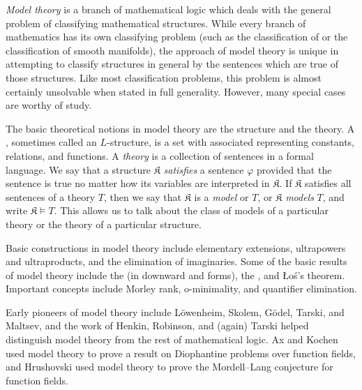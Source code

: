 \documentclass[12pt]{article}
\begin{document}

\emph{Model theory} is a branch of mathematical logic which deals with the general problem of classifying mathematical structures.  While every branch of mathematics has its own classifying problem (such as the classification of  or the classification of smooth manifolds), the approach of model theory is unique in attempting to classify structures in general by the sentences which are true of those structures.  Like most classification problems, this problem is almost certainly unsolvable when stated in full generality.  However, many special cases are worthy of study.

The basic theoretical notions in model theory are the structure and the theory.  A \emph{}, sometimes called an $L$-structure, is a set with associated  representing constants, relations, and functions.  A \emph{theory} is a collection of sentences in a formal language.  We say that a structure $\mathfrak{K}$ \emph{satisfies} a sentence $\varphi$ provided that the sentence is true no matter how its variables are interpreted in $\mathfrak{K}$.  If $\mathfrak{K}$ satisfies all sentences of a theory $T$, then we say that $\mathfrak{K}$ is a \emph{model} or $T$, or $\mathfrak{K}$ \emph{models} $T$, and write $\mathfrak{K}\models T$.  This allows us to talk about the class of models of a particular theory or the theory of a particular structure.

Basic constructions in model theory include elementary extensions, ultrapowers and ultraproducts, and the elimination of imaginaries.  Some of the basic results of model theory include the  (in downward and  forms), the , and \L o\'s's theorem.  Important concepts include Morley rank, o-minimality, and quantifier elimination.

Early pioneers of model theory include L\"owenheim, Skolem, G\"odel, Tarski, and Maltsev, and the work of Henkin, Robinson, and (again) Tarski helped distinguish model theory from the rest of mathematical logic.  Ax and Kochen used model theory to prove a result on Diophantine problems over function fields, and Hrushovski used model theory to prove the Mordell--Lang conjecture for function fields.
\end{document}

